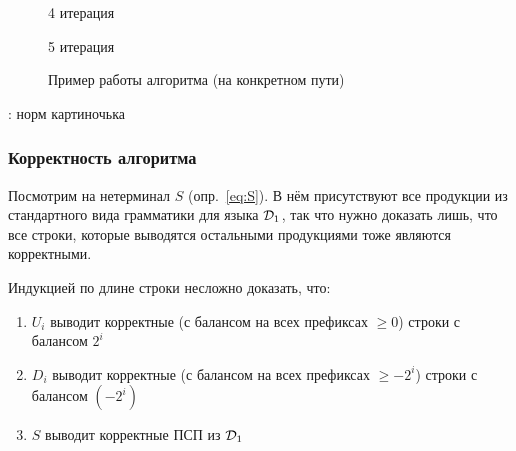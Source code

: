 \begin{figure}[H]
\begin{minipage}[h]{0.47\linewidth}
    \end{minipage}
    \vfill
    \begin{minipage}[h]{0.47\linewidth}
         4 итерация
    \end{minipage}
    \hfill
    \begin{minipage}[h]{0.47\linewidth}
         5 итерация
    \end{minipage}

    \caption{Пример работы алгоритма (на конкретном пути)}
    \label{img:dyck1_example}
\end{figure}

\TODO: норм картиночька

\subsubsection{Корректность алгоритма}

Посмотрим на нетерминал $S$ (опр.~\ref{eq:S}). В нём присутствуют все продукции из стандартного вида грамматики для языка $\mathcal{D}_1$, так что нужно доказать лишь, что все строки, которые выводятся остальными продукциями тоже являются корректными. 

Индукцией по длине строки несложно доказать, что:

\vspace{-\topsep}
\begin{enumerate}
  \setlength\itemsep{-0.1em}
  \item $U_i$ выводит корректные (с балансом на всех префиксах $\ge 0$) строки с балансом $2^{i}$
  \item $D_i$ выводит корректные (с балансом на всех префиксах $\ge -2^{i}$) строки с балансом $(-2^{i})$
  \item $S$ выводит корректные ПСП из $\mathcal{D}_1$
\end{enumerate}


